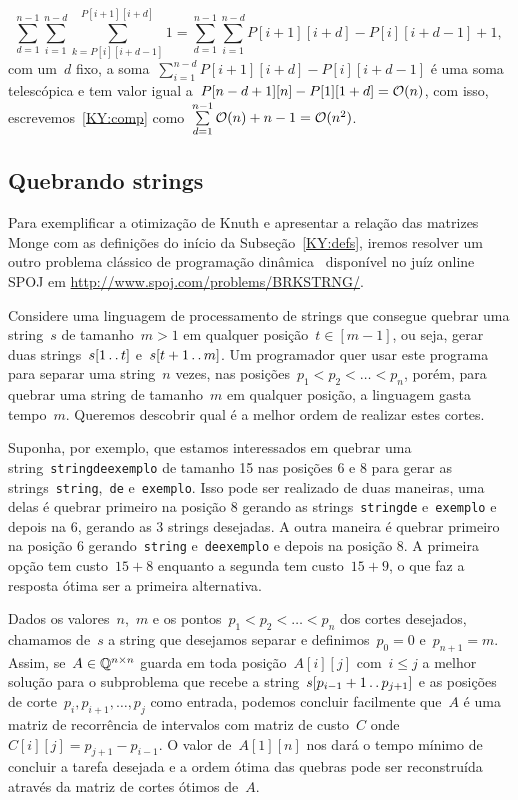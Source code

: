 \begin{equation} \label{KY:comp}
{\sum\limits_{d = 1}^{n-1} \sum\limits_{i=1}^{n-d} \sum\limits_{k=P[i][i+d-1]}^{P[i+1][i+d]} 1 = \sum\limits_{d = 1}^{n-1} \sum\limits_{i=1}^{n-d} P[i+1][i+d] - P[i][i+d-1] + 1} \text{, }
\end{equation}
com um~$d$ fixo, a soma~$\sum\limits_{i=1}^{n-d} P[i+1][i+d] - P[i][i+d-1]$ é uma soma telescópica e tem valor igual a~$P[n-d+1][n] - P[1][1+d] = \mathcal{O}(n)$, com isso, escrevemos~\eqref{KY:comp} como~$\sum\limits_{d=1}^{n-1} \mathcal{O}(n) + n - 1 = \mathcal{O}(n^2)$.


\subsection{Quebrando strings}

Para exemplificar a otimização de Knuth e apresentar a relação das matrizes Monge com as definições do início da Subseção~\ref{KY:defs}, iremos resolver um outro problema clássico de programação dinâmica~\cite[Exercício~15-9]{CLRS} disponível no juíz online SPOJ em \url{http://www.spoj.com/problems/BRKSTRNG/}. 

Considere uma linguagem de processamento de strings que consegue quebrar uma string~$s$ de tamanho~$m > 1$ em qualquer posição~$t \in [m-1]$, ou seja, gerar duas strings~$s[1 \,.\,.\, t]$ e~$s[t+1 \,.\,.\, m]$. Um programador quer usar este programa para separar uma string~$n$ vezes, nas posições~${p_1 < p_2 < \dots < p_{n}}$, porém, para quebrar uma string de tamanho~$m$ em qualquer posição, a linguagem gasta tempo~$m$. Queremos descobrir qual é a melhor ordem de realizar estes cortes. 

Suponha, por exemplo, que estamos interessados em quebrar uma string~\texttt{stringdeexemplo} de tamanho 15 nas posições 6 e 8 para gerar as strings~\texttt{string},~\texttt{de} e~\texttt{exemplo}. Isso pode ser realizado de duas maneiras, uma delas é quebrar primeiro na posição 8 gerando as strings~\texttt{stringde} e~\texttt{exemplo} e depois na 6, gerando as 3 strings desejadas. A outra maneira é quebrar primeiro na posição 6 gerando~\texttt{string} e~\texttt{deexemplo} e depois na posição 8. A primeira opção tem custo~$15 + 8$ enquanto a segunda tem custo~$15 + 9$, o que faz a resposta ótima ser a primeira alternativa.

Dados os valores~$n$,~$m$ e os pontos~$p_1 < p_2 < \dots < p_{n}$ dos cortes desejados, chamamos de~$s$ a string que desejamos separar e definimos~$p_0 = 0$ e~$p_{n+1} = m$. Assim, se~$A \in \mathbb{Q}^{n \times n}$ guarda em toda posição~$A[i][j]$ com~$i \leq j$ a melhor solução para o subproblema que recebe a string~${s[p_{i-1} + 1 \,.\,.\, p_{j+1}]}$ e as posições de corte~$p_{i},p_{i+1},\dots,p_{j}$ como entrada, podemos concluir facilmente que~$A$ é uma matriz de recorrência de intervalos com matriz de custo~$C$ onde~$C[i][j] = p_{j+1} - p_{i-1}$. O valor de~$A[1][n]$ nos dará o tempo mínimo de concluir a tarefa desejada e a ordem ótima das quebras pode ser reconstruída através da matriz de cortes ótimos de~$A$.

